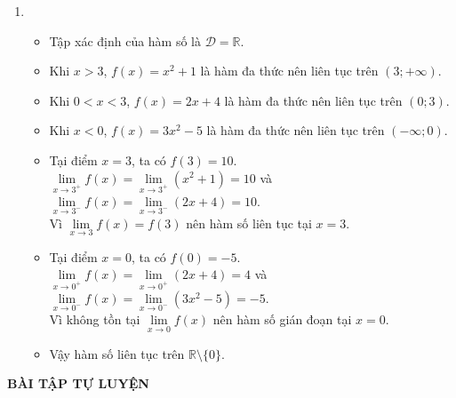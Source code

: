 \begin{vd}
{\begin{enumerate}
\begin{itemize}
				Vì $\lim\limits_{x\to 1}f(x)=f(1)$ nên hàm số liên tục tại $x=1$.
				\item Vậy hàm số liên tục trên $\mathbb{R}$.
				\end{itemize}
			\item \begin{itemize}
				\item Tập xác định của hàm số là $\mathscr{D}=\mathbb{R}$.
				\item Khi $x>3$, $f(x)=x^2+1$ là hàm đa thức nên liên tục trên $(3;+\infty)$.
				\item Khi $0<x<3$, $f(x)=2x+4$ là hàm đa thức nên liên tục trên $(0;3)$.
				\item Khi $x<0$, $f(x)=3x^2-5$ là hàm đa thức nên liên tục trên $(-\infty;0)$.
				\item Tại điểm $x=3$, ta có $f(3)=10$.\\
				$\lim\limits_{x\to 3^+}f(x)=\lim\limits_{x\to 3^+}(x^2+1)=10$ và $\lim\limits_{x\to 3^-}f(x)=\lim\limits_{x\to 3^-}(2x+4)=10$.\\
				Vì $\lim\limits_{x\to 3}f(x)=f(3)$ nên hàm số liên tục tại $x=3$.
				\item Tại điểm $x=0$, ta có $f(0)=-5$.\\
				$\lim\limits_{x\to 0^+}f(x)=\lim\limits_{x\to 0^+}(2x+4)=4$ và $\lim\limits_{x\to 0^-}f(x)=\lim\limits_{x\to 0^-}(3x^2-5)=-5$.\\
				Vì không tồn tại $\lim\limits_{x\to 0}f(x)$ nên hàm số gián đoạn tại $x=0$.
				\item Vậy hàm số liên tục trên $\mathbb{R}\setminus\{0\}$.
				\end{itemize}
	\end{enumerate}}
\end{vd}

\begin{center}
	\textbf{BÀI TẬP TỰ LUYỆN}
\end{center}

